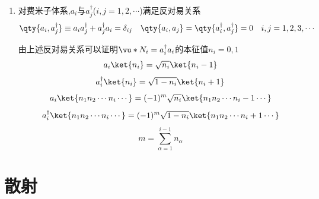 \begin{formal}
\begin{enumerate}
            \item 对费米子体系,$a_{i}$与$a_{j}^{\dagger}$($i,j=1,2,\cdots$)满足反对易关系
                  $$ 
                  \qty{ a_{i},a_{j}^{\dagger}} \equiv a_{i} a_{j}^{\dagger} + a_{j}^{\dagger} a_{i} = \delta_{ij} \quad 
                  \qty{a_{i},a_{j}} =  \qty{a_{i}^{\dagger},a_{j}^{\dagger}} = 0 \quad 
                  i,j=1,2,3,\cdots
                  $$

                  由上述反对易关系可以证明$\vu*{N}_{i} = a_{i}^{\dagger} a_{i} $的本征值$n_{i} = 0,1$
                  $$
                  a_{i} \ket{n_{i}} = \sqrt{n_{i}} \ket{n_{i} - 1}
                  $$
                  $$
                  a_{i}^{\dagger} \ket{n_{i}} = \sqrt{1-n_{i}} \ket{n_{i} + 1}
                  $$
                  $$
                  a_{i} \ket{n_{1}n_{2}\cdots n_{i}\cdots}  = (-1)^{m} \sqrt{n_{i}} \ket{n_{1}n_{2}\cdots n_{i} - 1 \cdots} 
                  $$
                  $$
                  a_{i}^{\dagger} \ket{n_{1}n_{2}\cdots n_{i}\cdots}  = (-1)^{m} \sqrt{1 - n_{i}} \ket{n_{1}n_{2}\cdots n_{i} + 1 \cdots} 
                  $$
                  $$
                  m = \sum\limits_{\alpha=1}^{i-1} n_{\alpha}
                  $$
        \end{enumerate}
        \end{formal}

    \section{散射}
    
    


  
